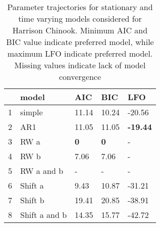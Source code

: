 \begin{table}[ht]
\centering
\caption{Parameter trajectories for stationary 
  and time varying models considered for Harrison Chinook. 
  Minimum AIC and BIC value indicate preferred model, while 
  maximum LFO indicate preferred model. Missing values 
  indicate lack of model convergence} 
\label{harcrit}
\begin{tabular}{rllll}
  \hline
 & model & AIC & BIC & LFO \\ 
  \hline
1 & simple & 11.14 & 10.24 & -20.56 \\ 
  2 & AR1 & 11.05 & 11.05 & \textbf{-19.44} \\ 
  3 & RW a & \textbf{0} & \textbf{0} & - \\ 
  4 & RW b & 7.06 & 7.06 & - \\ 
  5 & RW a and b & - & - & - \\ 
  6 & Shift a & 9.43 & 10.87 & -31.21 \\ 
  7 & Shift b & 19.41 & 20.85 & -38.91 \\ 
  8 & Shift a and b & 14.35 & 15.77 & -42.72 \\ 
   \hline
\end{tabular}
\end{table}
